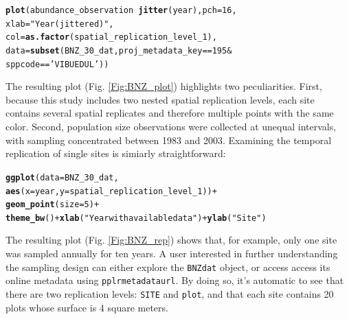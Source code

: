 \documentclass{article}\usepackage[]{graphicx}\usepackage[]{color}
\makeatletter
\newcommand{\hlnum}[1]{\textcolor[rgb]{0.686,0.059,0.569}{#1}}%
\newcommand{\hlstr}[1]{\textcolor[rgb]{0.192,0.494,0.8}{#1}}%
\newcommand{\hlopt}[1]{\textcolor[rgb]{0,0,0}{#1}}%
\newcommand{\hlstd}[1]{\textcolor[rgb]{0.345,0.345,0.345}{#1}}%
\newcommand{\hlkwc}[1]{\textcolor[rgb]{0.333,0.667,0.333}{#1}}%
\newcommand{\hlkwd}[1]{\textcolor[rgb]{0.737,0.353,0.396}{\textbf{#1}}}%
\newenvironment{kframe}{%
 \def\at@end@of@kframe{}%
 \ifinner\ifhmode%
  \def\at@end@of@kframe{\end{minipage}}%
  \begin{minipage}{\columnwidth}%
 \fi\fi%
 \def\FrameCommand##1{\hskip\@totalleftmargin \hskip-\fboxsep
 \colorbox{shadecolor}{##1}\hskip-\fboxsep
     \hskip-\linewidth \hskip-\@totalleftmargin \hskip\columnwidth}%
 \MakeFramed {\advance\hsize-\width
   \@totalleftmargin\z@ \linewidth\hsize
   \@setminipage}}%
 {\par\unskip\endMakeFramed%
 \at@end@of@kframe}
\newenvironment{knitrout}{}{} %
\makeatother
\begin{document}
\begin{knitrout}
\color{fgcolor}\begin{kframe}
\begin{alltt}
\hlkwd{plot}\hlstd{(abundance_observation} \hlopt{~} \hlkwd{jitter}\hlstd{(year),} \hlkwc{pch} \hlstd{=} \hlnum{16}\hlstd{,}
     \hlkwc{xlab} \hlstd{=} \hlstr{"Year (jittered)"}\hlstd{,}
     \hlkwc{col}  \hlstd{=} \hlkwd{as.factor}\hlstd{(spatial_replication_level_1),}
     \hlkwc{data} \hlstd{=} \hlkwd{subset}\hlstd{(BNZ_30_dat, proj_metadata_key} \hlopt{==} \hlnum{195} \hlopt{&}
                               \hlstd{sppcode} \hlopt{==} \hlstr{'VIBUEDUL'}\hlstd{) )}
\end{alltt}
\end{kframe}
\end{knitrout}
The resulting plot (Fig. \ref{Fig:BNZ_plot}) highlights two peculiarities. First, because this study includes two nested spatial replication levels, each site contains several spatial replicates and therefore multiple points with the same color. Second, population size observations were collected at unequal intervals, with sampling concentrated between 1983 and 2003. Examining the temporal replication of single sites is simiarly straightforward:

\begin{knitrout}
\color{fgcolor}\begin{kframe}
\begin{alltt}
\hlkwd{ggplot}\hlstd{(}\hlkwc{data} \hlstd{= BNZ_30_dat,}
       \hlkwd{aes}\hlstd{(}\hlkwc{x} \hlstd{= year,} \hlkwc{y} \hlstd{= spatial_replication_level_1) )} \hlopt{+}
  \hlkwd{geom_point}\hlstd{(}\hlkwc{size} \hlstd{=} \hlnum{5}\hlstd{)} \hlopt{+}
  \hlkwd{theme_bw}\hlstd{()} \hlopt{+} \hlkwd{xlab}\hlstd{(}\hlstr{"Year with available data"}\hlstd{)} \hlopt{+} \hlkwd{ylab}\hlstd{(}\hlstr{"Site"}\hlstd{)}
\end{alltt}
\end{kframe}
\end{knitrout}

The resulting plot (Fig. \ref{Fig:BNZ_rep}) shows that, for example, only one site was sampled annually for ten years. A user interested in further understanding the sampling design can either explore the \texttt{BNZ\textunderscore dat} object, or access access its online metadata using \texttt{pplr\textunderscore metadata\textunderscore url}. By doing so, it's automatic to see that there are two replication levels: \texttt{SITE} and \texttt{plot}, and that each site contains 20 plots whose surface is 4 square meters.
\end{document}
